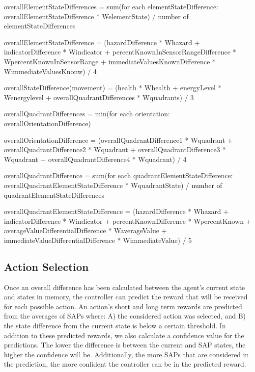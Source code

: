 overallElementStateDifferences = sum(for each elementStateDifference: overallElementStateDifference * WelementState) / number of elementStateDifferences

overallElementStateDifference = (hazardDifference * Whazard + indicatorDifference * Windicator + percentKnownInSensorRangeDifference * WpercentKnownInSensorRange + immediateValuesKnownDifference * WimmediateValuesKnonw) / 4

overallStateDifference(movement) = (health * Whealth + energyLevel * Wenergylevel + overallQuadrantDifferences * Wquadrants) / 3

overallQuadrantDifferences = min(for each orientation: overallOrientationDifference)

overallOrientationDifference = (overallQuadrantDifference1 * Wquadrant + overallQuadrantDifference2 * Wquadrant + overallQuadrantDifference3 * Wquadrant + overallQuadrantDifference4 * Wquadrant) / 4

overallQuadrantDifference = sum(for each quadrantElementStateDifference: overallQuadrantElementStateDifference * WquadrantState) / number of quadrantElementStateDifferences

overallQuadrantElementStateDifference = (hazardDifference * Whazard + indicatorDifference * Windicator + percentKnownDifference * WpercentKnown + averageValueDifferentialDifference * WaverageValue + immediateValueDifferentialDifference * WimmediateValue) / 5



\subsection{Action Selection}
Once an overall difference has been calculated between the agent's current state and states in memory, the controller can predict the reward that will be received for each possible action.
An action's short and long term rewards are predicted from the averages of SAPs where: A) the considered action was selected, and B) the state difference from the current state is below a certain threshold.
In addition to these predicted rewards, we also calculate a confidence value for the predictions.
The lower the difference is between the current and SAP states, the higher the confidence will be.
Additionally, the more SAPs that are considered in the prediction, the more confident the controller can be in the predicted reward.
